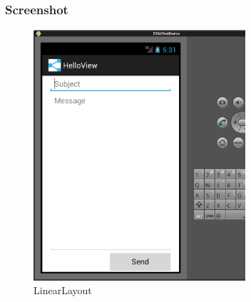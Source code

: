 \begin{frame}
   \frametitle{Screenshot}
   \begin{figure}[h!]
     \centering
     \includegraphics[width=0.7\textwidth]{pictures/linear_layout.ps}
     \caption{
        LinearLayout
     }
     \label{fig:linear_layout}
   \end{figure}
\end{frame}

